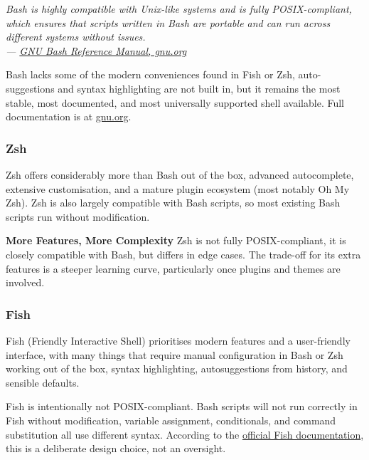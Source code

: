 \documentclass{article}
\begin{document}
\begin{mdframed}[linewidth=1.5pt, linecolor=black!50, topline=true, bottomline=true,
	leftline=false, rightline=false, backgroundcolor=black!3]
	\small\itshape
	Bash is highly compatible with Unix-like systems and is fully POSIX-compliant,
	which ensures that scripts written in Bash are portable and can run across
	different systems without issues.\\[4pt]
	\normalfont\small ---
	\href{https://www.gnu.org/software/bash/manual/html_node/index.html}{GNU Bash
		Reference Manual, gnu.org}
\end{mdframed}

\noindent Bash lacks some of the modern conveniences found in Fish or Zsh,
auto-suggestions and syntax highlighting are not built in, but it remains the
most stable, most documented, and most universally supported shell available.
Full documentation is at
\href{https://www.gnu.org/software/bash/manual/html_node/index.html}{gnu.org}.

\subsubsection{Zsh}

Zsh offers considerably more than Bash out of the box, advanced autocomplete,
extensive customisation, and a mature plugin ecosystem (most notably Oh My Zsh).
Zsh is also largely compatible with Bash scripts, so most existing Bash scripts
run without modification.

\begin{callout}{\textbf{More Features, More Complexity}}
	Zsh is not fully POSIX-compliant, it is closely compatible with Bash, but
	differs in edge cases. The trade-off for its extra features is a steeper
	learning curve, particularly once plugins and themes are involved.
\end{callout}

\subsubsection{Fish}

Fish (Friendly Interactive Shell) prioritises modern features and a user-friendly
interface, with many things that require manual configuration in Bash or Zsh
working out of the box, syntax highlighting, autosuggestions from history, and
sensible defaults.

\begin{tcolorbox}[arc=12pt, outer arc=10pt,
	colback=red!5!white, colframe=red!60!black,
	title=\textbf{Fish is Not POSIX-Compliant}]
	Fish is intentionally not POSIX-compliant. Bash scripts will not run correctly
	in Fish without modification, variable assignment, conditionals, and
	command substitution all use different syntax. According to the
	\href{https://fishshell.com/docs/current/fish_for_bash_users.html}{official
		Fish documentation}, this is a deliberate design choice, not an oversight.
\end{tcolorbox}
\end{document}
